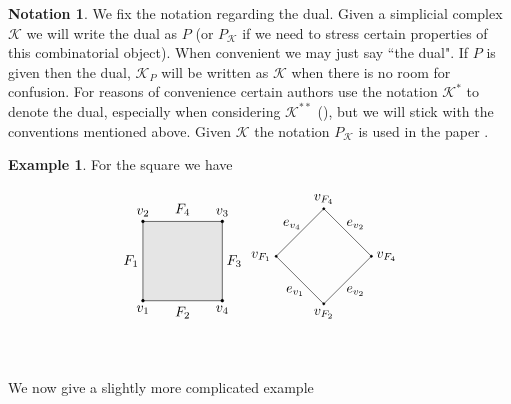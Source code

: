 \documentclass[oneside,12pt]{amsart}
\theoremstyle{definition}
\newtheorem{Notation}[Theorem]{Notation}
\newtheorem{Example}[Theorem]{Example}
\numberwithin{equation}{section}
\begin{document}
\begin{Notation}
We fix the notation regarding the dual.  Given a simplicial complex $\mathcal{K}$ we will write the dual as $P$ (or $P_{\mathcal{K}}$ if we need to stress certain properties of this combinatorial object).  When convenient we may just say ``the dual".  If $P$ is given then the dual, $\mathcal{K}_P$ will be written as $\mathcal{K}$ when there is no room for confusion.  For reasons of convenience certain authors use the notation $\mathcal{K}^*$ to denote the dual, especially when considering $\mathcal{K}^{**}$ (\cite{G}), but we will stick with the conventions mentioned above.  Given $\mathcal{K}$ the notation $P_{\mathcal{K}}$ is used in the paper \cite{DJ}.
\end{Notation}

\begin{Example}\label{Dual Square}
For the square we have \\
\begin{minipage}{\linewidth}
$$
\begin{tikzpicture}
\filldraw[color=gray!20] (0,0)--(0,2)--(2,2)--(2,0)--(0,0);
\draw (0,0)--(0,2)--(2,2)--(2,0)--(0,0);
\filldraw[black] (0,0) node[below=.1pt]{$v_1$} circle (1pt);
\filldraw[black] (0,2) node[above=.1pt]{$v_2$} circle (1pt);
\filldraw[black] (2,2) node[above=.1pt]{$v_3$} circle (1pt);
\filldraw[black] (2,0) node[below=.1pt]{$v_4$} circle (1pt);
\draw (-.3,1) node{$F_1$} ;
\draw (1,2.3) node{$F_4$} ;
\draw (2.3,1) node{$F_3$} ;
\draw (1,-.3) node{$F_2$} ;
\end{tikzpicture}
\begin{tikzpicture}[scale=.8]
\draw (0,-.5)--(-1.5,1)--(0,2.5)--(1.5,1)--(0,-.5);
\filldraw[black] (0,-.5) node[below=.1pt]{$v_{F_2}$} circle (1pt);
\filldraw[black] (-1.5,1) node[left=.1pt]{$v_{F_1}$} circle (1pt);
\filldraw[black] (0,2.5) node[above=.1pt]{$v_{F_4}$} circle (1pt);
\filldraw[black] (1.5,1) node[right=.1pt]{$v_{F_4}$} circle (1pt);
\draw (-.9,-.1) node{$e_{v_1}$} ;
\draw (-1,2) node{$e_{v_4}$} ;
\draw (1,-.1) node{$e_{v_2}$} ;
\draw (1,2) node{$e_{v_2}$} ;
\end{tikzpicture}$$
\end{minipage}\\[2ex]
\end{Example}

We now give a slightly more complicated example
\end{document}
